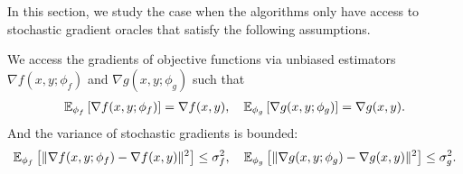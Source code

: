 \documentclass[twoside,11pt]{article}
\begin{document}
In this section, we study the case when the algorithms only have access to stochastic gradient oracles that satisfy the following assumptions.

\begin{asm} \label{asm:stochastic}
We access the gradients of objective functions via unbiased estimators $ \nabla f(x,y; \phi_f)$ and $\nabla g(x,y; \phi_g)$ such that
   \begin{align*}
        {\mathbb{E}}_{\phi_f} \left[ \nabla f(x,y;\phi_f) \right] = \nabla f(x,y), \quad {\mathbb{E}}_{\phi_g} \left[ \nabla g(x,y;\phi_g) \right] = \nabla g(x,y).
    \end{align*}
And the variance of stochastic gradients is bounded:
\begin{align*}
    {\mathbb{E}}_{\phi_f} \left[ \Vert \nabla f(x,y;\phi_f ) - \nabla f(x,y) \Vert^2 \right] \le \sigma_f^2, \quad {\mathbb{E}}_{\phi_g} \left[ \Vert \nabla g(x,y;\phi_g) - \nabla g(x,y) \Vert^2 \right] \le \sigma_g^2.
\end{align*}
    
\end{asm}
\end{document}
